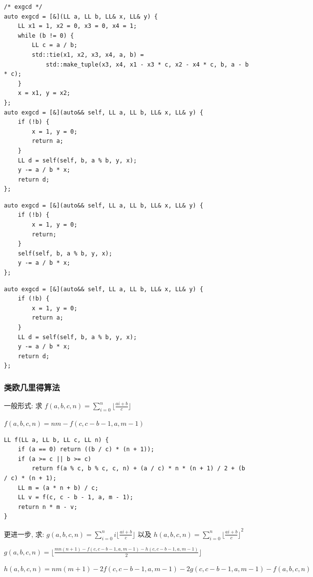 \documentclass[UTF8, a4paper, titlepage, twoside]{ctexart}
\begin{document}
\begin{lstlisting}[style=cpp]
/* exgcd */
auto exgcd = [&](LL a, LL b, LL& x, LL& y) {
    LL x1 = 1, x2 = 0, x3 = 0, x4 = 1;
    while (b != 0) {
        LL c = a / b;
        std::tie(x1, x2, x3, x4, a, b) =
            std::make_tuple(x3, x4, x1 - x3 * c, x2 - x4 * c, b, a - b * c);
    }
    x = x1, y = x2;
};
auto exgcd = [&](auto&& self, LL a, LL b, LL& x, LL& y) {
    if (!b) {
        x = 1, y = 0;
        return a;
    }
    LL d = self(self, b, a % b, y, x);
    y -= a / b * x;
    return d;
};
\end{lstlisting}

\begin{lstlisting}[style=cpp]
auto exgcd = [&](auto&& self, LL a, LL b, LL& x, LL& y) {
    if (!b) {
        x = 1, y = 0;
        return;
    }
    self(self, b, a % b, y, x);
    y -= a / b * x;
};
\end{lstlisting}

\begin{lstlisting}[style=cpp]
auto exgcd = [&](auto&& self, LL a, LL b, LL& x, LL& y) {
    if (!b) {
        x = 1, y = 0;
        return a;
    }
    LL d = self(self, b, a % b, y, x);
    y -= a / b * x;
    return d;
};
\end{lstlisting}

\subsubsection*{ 类欧几里得算法 }

一般形式: 求 $f(a, b, c, n) = \sum\limits_{i = 0}^{n}\lfloor{\frac{ai+b}{c}}\rfloor$​

$f(a, b, c, n) = nm-f(c, c - b - 1, a, m - 1)$

\begin{lstlisting}[style=cpp]
LL f(LL a, LL b, LL c, LL n) {
    if (a == 0) return ((b / c) * (n + 1));
    if (a >= c || b >= c)
        return f(a % c, b % c, c, n) + (a / c) * n * (n + 1) / 2 + (b / c) * (n + 1);
    LL m = (a * n + b) / c;
    LL v = f(c, c - b - 1, a, m - 1);
    return n * m - v;
}
\end{lstlisting}

更进一步, 求: $g(a, b, c, n) = \sum\limits_{i = 0}^{n}i\lfloor{\frac{ai+b}{c}}\rfloor$ 以及 $h(a, b, c, n) = \sum\limits_{i = 0}^{n}{\lfloor{\frac{ai+b}{c}}\rfloor}^2$​

$g(a, b, c, n) = \lfloor{\frac{mn(n+1)-f(c, c-b-1, a, m-1)-h(c, c-b-1, a, m-1)}{2}}\rfloor$​

$h(a, b, c, n) = nm(m+1)-2f(c, c - b-1, a, m- 1)-2g(c,c-b-1,a,m-1)-f(a, b, c, n)$
\end{document}
